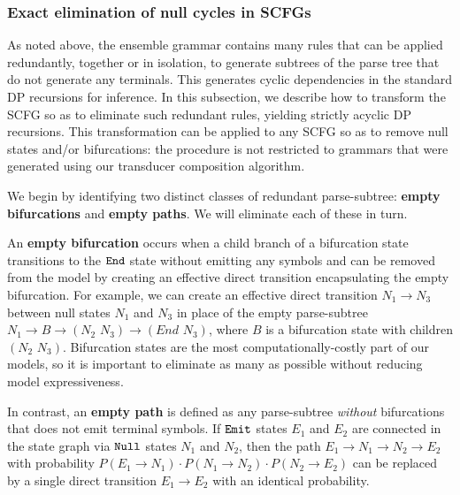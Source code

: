 \documentclass[10pt]{article}
\begin{document}
\subsubsection*{Exact elimination of null cycles in SCFGs}

As noted above, the ensemble grammar contains many rules that can be applied redundantly,
together or in isolation, to generate subtrees of the parse tree that do
not generate any terminals.
This generates cyclic dependencies in the standard DP recursions for inference.
In this subsection, we describe how to transform the SCFG so as to eliminate such redundant rules, yielding strictly acyclic DP recursions.
This transformation can be applied to any SCFG so as to remove null states and/or bifurcations:
the procedure is not restricted to grammars that were generated using our transducer composition algorithm.

We begin by identifying two distinct classes of redundant parse-subtree: {\bf empty bifurcations} and {\bf empty paths}.
We will eliminate each of these in turn.

An {\bf empty bifurcation} occurs when a child branch of a bifurcation state
transitions to the $\mathtt{End}$ state without emitting any symbols and can
be removed from the model by creating an effective direct transition
encapsulating the empty bifurcation.  For
example, we can create an effective direct transition $N_1 \rightarrow
N_3$ between null states $N_1$ and $N_3$ in place of the empty
parse-subtree $N_1 \rightarrow B \rightarrow (N_2 \,\, N_3) \rightarrow
(End \,\, N_3)$, where $B$ is a bifurcation state with children $(N_2
\,\, N_3)$. Bifurcation states are the most computationally-costly
part of our models, so it is important to eliminate as many as
possible without reducing model expressiveness.

In contrast, an {\bf empty path} is defined as any parse-subtree {\em without} bifurcations that does not emit terminal symbols.
If $\mathtt{Emit}$ states $E_1$ and $E_2$ are connected in the state
graph via $\mathtt{Null}$ states $N_1$ and $N_2$, then the path $E_1
\rightarrow N_1 \rightarrow N_2 \rightarrow E_2$ with  probability
$P(E_1 \rightarrow N_1) \cdot P(N_1 \rightarrow N_2) \cdot P(N_2
\rightarrow E_2)$ can be replaced by a single direct transition $E_1 \rightarrow
E_2$ with an identical probability.

\end{document}
